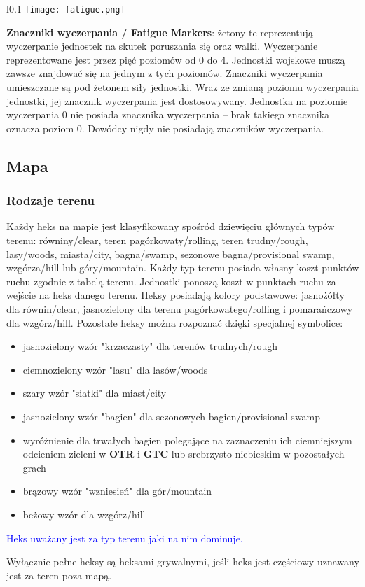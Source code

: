 \begin{wrapfigure}{l}{0.1\textwidth}
    \texttt{[image: fatigue.png]}
\end{wrapfigure}
\textbf{Znaczniki wyczerpania / Fatigue Markers}: żetony te reprezentują wyczerpanie jednostek na skutek poruszania się oraz walki. Wyczerpanie reprezentowane jest przez pięć poziomów od 0 do 4. Jednostki wojskowe muszą zawsze znajdować się na jednym z tych poziomów. Znaczniki wyczerpania umieszczane są pod żetonem siły jednostki. Wraz ze zmianą poziomu wyczerpania jednostki, jej znacznik wyczerpania jest dostosowywany. Jednostka na poziomie wyczerpania 0 nie posiada znacznika wyczerpania -- brak takiego znacznika oznacza poziom 0. Dowódcy nigdy nie posiadają znaczników wyczerpania.

\subsection{Mapa}
\subsubsection*{Rodzaje terenu}
Każdy heks na mapie jest klasyfikowany spośród dziewięciu głównych typów terenu: równiny/clear, teren pagórkowaty/rolling, teren trudny/rough, lasy/woods, miasta/city, bagna/swamp, sezonowe bagna/provisional swamp, wzgórza/hill lub góry/mountain. Każdy typ terenu posiada własny koszt punktów ruchu zgodnie z tabelą terenu. Jednostki ponoszą koszt w punktach ruchu za wejście na heks danego terenu. Heksy posiadają kolory podstawowe: jasnożółty dla równin/clear, jasnozielony dla terenu pagórkowatego/rolling i pomarańczowy dla wzgórz/hill. Pozostałe heksy można rozpoznać dzięki specjalnej symbolice:
\begin{itemize}
    \item jasnozielony wzór "krzaczasty" dla terenów trudnych/rough
    \item ciemnozielony wzór "lasu" dla lasów/woods
    \item szary wzór "siatki" dla miast/city
    \item jasnozielony wzór "bagien" dla sezonowych bagien/provisional swamp
    \item wyróżnienie dla trwałych bagien polegające na zaznaczeniu ich ciemniejszym odcieniem zieleni w \textbf{OTR} i \textbf{GTC} lub srebrzysto-niebieskim w pozostałych grach
    \item brązowy wzór "wzniesień" dla gór/mountain
    \item beżowy wzór dla wzgórz/hill
\end{itemize}
\textcolor{blue}{Heks uważany jest za typ terenu jaki na nim dominuje.}\par
Wyłącznie pełne heksy są heksami grywalnymi, jeśli heks jest częściowy uznawany jest za teren poza mapą.
